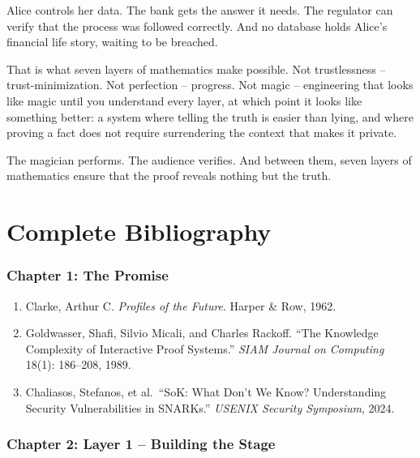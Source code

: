 \documentclass[
  11pt,
  openany]{report}
\providecommand{\tightlist}{%
  \setlength{\itemsep}{0pt}\setlength{\parskip}{0pt}}
\begin{document}
Alice controls her data. The bank gets the answer it needs. The regulator can
verify that the process was followed correctly. And no database holds Alice's
financial life story, waiting to be breached.

That is what seven layers of mathematics make possible. Not trustlessness --
trust-minimization. Not perfection -- progress. Not magic -- engineering that
looks like magic until you understand every layer, at which point it looks like
something better: a system where telling the truth is easier than lying, and
where proving a fact does not require surrendering the context that makes it
private.

The magician performs. The audience verifies. And between them, seven layers of
mathematics ensure that the proof reveals nothing but the truth.

\chapter*{Complete Bibliography}\label{complete-bibliography}

\subsection{Chapter 1: The Promise}\label{chapter-1-the-promise}

\begin{enumerate}
\def\labelenumi{\arabic{enumi}.}
\tightlist
\item
  Clarke, Arthur C. \emph{Profiles of the Future}. Harper \& Row, 1962.
\item
  Goldwasser, Shafi, Silvio Micali, and Charles Rackoff. ``The Knowledge
  Complexity of Interactive Proof Systems.'' \emph{SIAM Journal on Computing}
  18(1): 186--208, 1989.
\item
  Chaliasos, Stefanos, et al.~``SoK: What Don't We Know? Understanding Security
  Vulnerabilities in SNARKs.'' \emph{USENIX Security Symposium}, 2024.
\end{enumerate}

\subsection{Chapter 2: Layer 1 -- Building the
Stage}\label{chapter-2-layer-1-building-the-stage-1}
\end{document}
